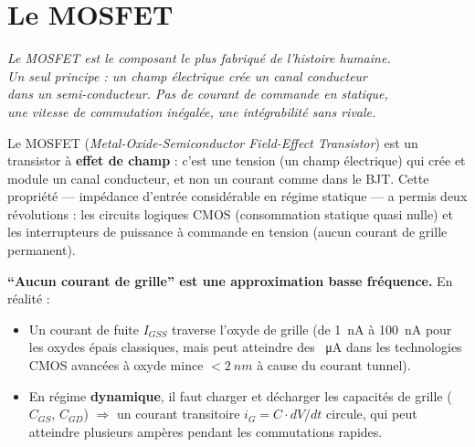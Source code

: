 \documentclass[12pt,a4paper,twoside]{book}
\begin{document}

\chapter{Le MOSFET}

\begin{center}
\textit{Le MOSFET est le composant le plus fabriqué de l'histoire humaine.\\
Un seul principe : un champ électrique crée un canal conducteur\\
dans un semi-conducteur. Pas de courant de commande en statique,\\
une vitesse de commutation inégalée, une intégrabilité sans rivale.}
\end{center}

\vspace{0.5cm}

Le MOSFET (\textit{Metal-Oxide-Semiconductor Field-Effect Transistor}) est un transistor à \textbf{effet de champ} : c'est une tension (un champ électrique) qui crée et module un canal conducteur, et non un courant comme dans le BJT. Cette propriété --- impédance d'entrée considérable en régime statique --- a permis deux révolutions : les circuits logiques CMOS (consommation statique quasi nulle) et les interrupteurs de puissance à commande en tension (aucun courant de grille permanent).

\begin{attention}
\textbf{``Aucun courant de grille'' est une approximation basse fréquence.} En réalité :
\begin{itemize}[nosep]
\item Un courant de fuite $I_{GSS}$ traverse l'oxyde de grille (de \SI{1}{nA} à \SI{100}{nA} pour les oxydes épais classiques, mais peut atteindre des \SI{}{\micro A} dans les technologies CMOS avancées à oxyde mince $< \SI{2}{nm}$ à cause du courant tunnel).
\item En régime \textbf{dynamique}, il faut charger et décharger les capacités de grille ($C_{GS}$, $C_{GD}$) $\Rightarrow$ un courant transitoire $i_G = C \cdot dV/dt$ circule, qui peut atteindre plusieurs ampères pendant les commutations rapides.
\end{itemize}
\end{attention}
\end{document}
